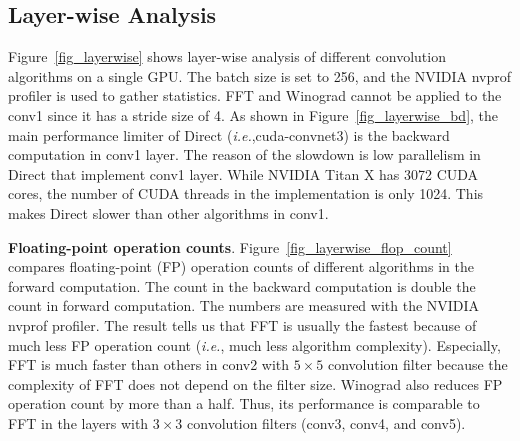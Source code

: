 \subsection{Layer-wise Analysis}

Figure~\ref{fig_layerwise} shows layer-wise analysis of different convolution algorithms on a single GPU. The batch size is set to 256, and the NVIDIA nvprof profiler is used to gather statistics. \textsf{FFT} and \textsf{Winograd} cannot be applied to the \textsf{conv1} since it has a stride size of 4. As shown in Figure~\ref{fig_layerwise_bd}, the main performance limiter of \textsf{Direct} (\textit{i.e.},cuda-convnet3) is the backward computation in \textsf{conv1} layer. The reason of the slowdown is low parallelism in \textsf{Direct} that implement \textsf{conv1} layer. While NVIDIA Titan X has 3072 CUDA cores, the number of CUDA threads in the implementation is only 1024. This makes \textsf{Direct} slower than other algorithms in \textsf{conv1}. 


{\bf Floating-point operation counts}. Figure~\ref{fig_layerwise_flop_count} compares floating-point (FP) operation counts of different algorithms in the forward computation. The count in the backward computation is double the count in forward computation.  The numbers are measured with the NVIDIA nvprof profiler. The result tells us that \textsf{FFT} is usually the fastest because of much less FP operation count (\textit{i.e.}, much less algorithm complexity). Especially, \textsf{FFT} is much faster than others in \textsf{conv2} with $5 \times 5$ convolution filter because the complexity of \textsf{FFT} does not depend on the filter size. \textsf{Winograd} also reduces FP operation count by more than a half. Thus, its performance is comparable to \textsf{FFT} in the layers with $3 \times 3$ convolution filters (\textsf{conv3}, \textsf{conv4}, and \textsf{conv5}).

